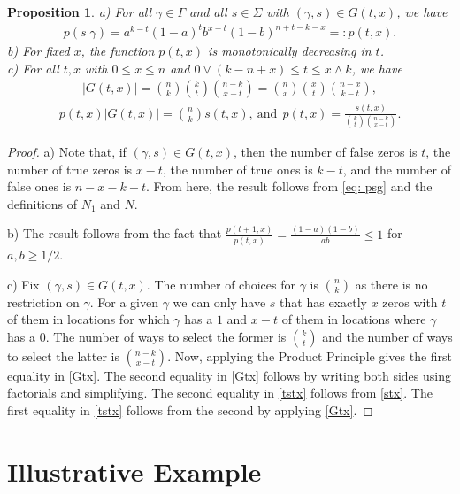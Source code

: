 \documentclass[a4paper,11pt]{article}
\newtheorem{prop}{Proposition}
\begin{document}
\begin{prop}\label{Lem1}
a) For all $\gamma \in \Gamma$ and all $s\in\Sigma$ with $(\gamma,s)\in G(t,x)$, we have
\begin{eqnarray}
p(s|\gamma) =a^{k-t}(1-a)^{t}b^{x-t}(1-b)^{n+t-k-x}=: p(t,x). \label{ptx}
\end{eqnarray}
b) For fixed $x$, the function $p(t,x)$ is monotonically decreasing in $t$. \\
c) For all $t,x$ with $0\leq x\leq n$ and $0\vee(k-n+x)\le t\le x\wedge k$, we have 
\begin{eqnarray}\label{Gtx}
|G(t,x)|= \binom{n}{k}\binom{k}{t}\binom{n-k}{x-t}=\binom{n}{x}\binom{x}{t}\binom{n-x}{k-t},
\end{eqnarray}
\begin{eqnarray}
p(t,x)|G(t,x)|=\binom{n}{k}s(t,x), \ \mbox{and} \ \ p(t,x)=\frac{s(t,x)}{\binom{k}{t}\binom{n-k}{x-t}}. \label{tstx}
\end{eqnarray}
\end{prop}

\begin{proof}
a) Note that, if $(\gamma,s)\in G(t,x)$, then the number of false zeros is $t$, the number of true zeros is $x-t$, the number of true ones is $k-t$, and the number of false ones is $n-x-k+t$. From here, the result follows from \eqref{eq: psg} and the definitions of $N_1$ and $N$.

b) The result follows from the fact that $\frac{p(t+1,x)}{p(t,x)}=\frac{(1-a)(1-b)}{ab}\le1$ for $a,b\ge1/2$. 

c) Fix $(\gamma,s)\in G(t,x)$. The number of choices for $\gamma$ is $\binom{n}{k}$ as there is no restriction on $\gamma$. For a given $\gamma$ we can only have $s$ that has exactly $x$ zeros with $t$ of them in locations for which $\gamma$ has a $1$ and $x-t$ of them in locations where $\gamma$ has a $0$. The number of ways to select the former is $\binom{k}{t}$ and the number of ways to select the latter is $\binom{n-k}{x-t}$. Now, applying the Product Principle gives the first equality in \eqref{Gtx}. The second equality in \eqref{Gtx} follows by writing both sides using factorials and simplifying. The second equality in \eqref{tstx} follows from \eqref{stx}. The first equality in \eqref{tstx} follows from the second by applying \eqref{Gtx}.
\end{proof}


\section{Illustrative Example} \label{sec: Example}
\end{document}
